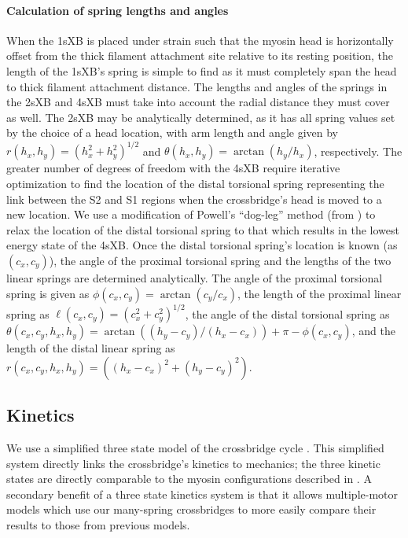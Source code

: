 \documentclass[]{article}
\begin{document}
\paragraph{Calculation of spring lengths and angles} %
When the 1sXB is placed under strain such that the myosin head is horizontally offset from the thick filament attachment site relative to its resting position, the length of the 1sXB's spring is simple to find as it must completely span the head to thick filament attachment distance.
The lengths and angles of the springs in the 2sXB and 4sXB must take into account the radial distance they must cover as well.
The 2sXB may be analytically determined, as it has all spring values set by the choice of a head location, with arm length and angle given by $r(h_x, h_y)=(h_x^2 + h_y^2)^{1/2}$ and $\theta(h_x, h_y)=\arctan(h_y/h_x)$, respectively.
The greater number of degrees of freedom with the 4sXB require iterative optimization to find the location of the distal torsional spring representing the link between the S2 and S1 regions when the crossbridge's head is moved to a new location.
We use a modification of Powell's ``dog-leg'' method (from \citet{SciPy}) to relax the location of the distal torsional spring to that which results in the lowest energy state of the 4sXB.
Once the distal torsional spring's location is known (as $(c_x, c_y)$), the angle of the proximal torsional spring and the lengths of the two linear springs are determined analytically.
The angle of the proximal torsional spring is given as $\phi(c_x, c_y)=\arctan(c_y/c_x)$, the length of the proximal linear spring as $\ell(c_x, c_y)=(c_x^2 + c_y^2)^{1/2}$, the angle of the distal torsional spring as $\theta(c_x, c_y, h_x, h_y) = \arctan((h_y-c_y)/(h_x-c_x)) + \pi - \phi(c_x, c_y)$, and the length of the distal linear spring as $r(c_x, c_y, h_x, h_y)=((h_x-c_x)^2 + (h_y-c_y)^2)$.

\subsection*{Kinetics} %

We use a simplified three state model of the crossbridge cycle \citep{Pate1989, Tanner2007}. 
This simplified system directly links the crossbridge's kinetics to mechanics; the three kinetic states are directly comparable to the myosin configurations described in \citet{Houdusse2000}.
A secondary benefit of a three state kinetics system is that it allows multiple-motor models which use our many-spring crossbridges to more easily compare their results to those from previous models.
\end{document}
